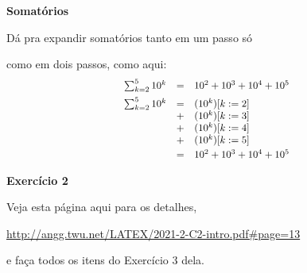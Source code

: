 \documentclass[oneside,12pt]{article}
\begin{document}
\newpage

%                                                        

{\bf Somatórios}

Dá pra expandir somatórios tanto em um passo só

como em dois passos, como aqui:
%
$$\scalebox{0.9}{$
  \begin{array}{rcl}
    \sum_{k=2}^{5} 10^k &=& 10^2 + 10^3 + 10^4 + 10^5 \\[5pt]
    \sum_{k=2}^{5} 10^k &=& (10^k) [k:=2] \\
                        &+& (10^k) [k:=3] \\
                        &+& (10^k) [k:=4] \\
                        &+& (10^k) [k:=5] \\[2.5pt]
                        &=& 10^2 + 10^3 + 10^4 + 10^5 \\
  \end{array}
  $}
$$


{\bf Exercício 2}

Veja esta página aqui para os detalhes,


{\footnotesize

\url{http://angg.twu.net/LATEX/2021-2-C2-intro.pdf#page=13}

}


e faça todos os itens do Exercício 3 dela.

\newpage

\end{document}
